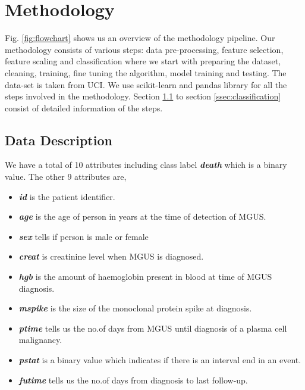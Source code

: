 \documentclass[conference]{IEEEtran}
\begin{document}
\section{Methodology}                                                                     
Fig. \ref{fig:flowchart} shows us an overview of the methodology pipeline. Our methodology consists of various steps: data pre-processing, feature selection, feature scaling and classification where we start with preparing the dataset, cleaning, training, fine tuning the algorithm, model training and testing. The data-set is taken from UCI\cite{uci}. We use scikit-learn \cite{scikit} and pandas library for all the steps involved in the methodology. Section \ref{ssec:describe} to section \ref{ssec:classification} consist of detailed information of the steps.     
\par              

\subsection{Data Description}
\label{ssec:describe}
We have a total of 10 attributes including class label \textbf{\textit{death}} which is a binary value. The other 9 attributes are,  

\begin{itemize}
\item \textbf{\textit{id}} is the patient identifier.
\item \textbf{\textit{age}} is the age of person in years at the time of detection of MGUS. 
\item \textbf{\textit{sex}} tells if person is male or female
\item \textbf{\textit{creat}} is creatinine level when MGUS is diagnosed.
\item \textbf{\textit{hgb}} is the amount of haemoglobin present in blood at time of MGUS diagnosis.
\item \textbf{\textit{mspike}} is the size of the monoclonal protein spike at diagnosis.
\item \textbf{\textit{ptime}} tells us the no.of days from MGUS until diagnosis of a plasma cell malignancy.
\item \textbf{\textit{pstat}} is a binary value which indicates if there is an interval end in an event.
\item \textbf{\textit{futime}} tells us the no.of days from diagnosis to last follow-up.
\end{itemize}
\end{document}
